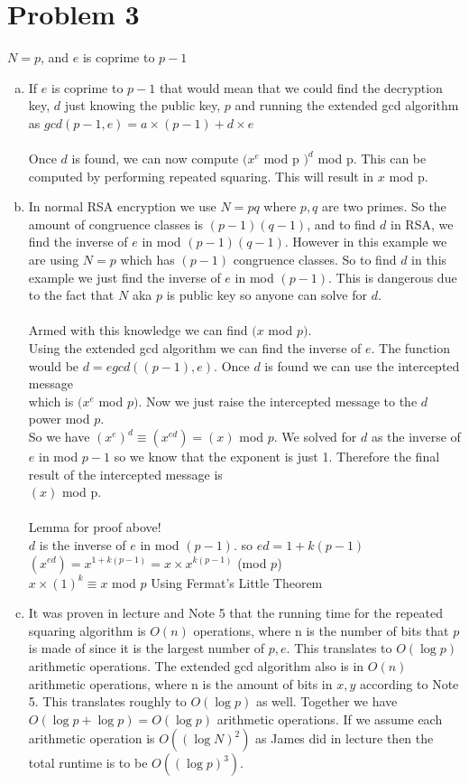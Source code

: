 \documentclass[11pt,letterpaper]{article}
\begin{document}
\section*{Problem 3}
$N=p$, and $e$ is coprime to $p-1$ 
\begin{enumerate}[(a)]
\item
If $e$ is coprime to $p-1$ that would mean that we could find the decryption key, $d$ just knowing the public key, $p$ and running the extended gcd algorithm as $gcd(p-1,e) = a\times(p-1)+d\times e$\\
\\
Once $d$ is found, we can now compute $(x^{e}$ mod p $)^{d}$ mod p. This can be computed by performing repeated squaring. This will result in $x$ mod p.\\

\item
In normal RSA encryption we use $N=pq$ where $p,q$ are two primes. So the amount of congruence classes is $(p-1)(q-1)$, and to find $d$ in RSA, we find the inverse of $e$ in mod $(p-1)(q-1)$. However in this example we are using $N=p$ which has $(p-1)$ congruence classes. So to find $d$ in this example we just find the inverse of $e$ in mod $(p-1)$. This is dangerous due to the fact that $N$ aka $p$ is public key so anyone can solve for $d$.\\
\\
Armed with this knowledge we can find $(x$ mod $p)$.\\
Using the extended gcd algorithm we can find the inverse of $e$. The function would be $d = egcd((p-1),e)$. Once $d$ is found we can use the intercepted message\\ which is $(x^e$ mod $p)$. Now we just raise the intercepted message to the $d$ power mod $p$.\\ So we have $(x^e)^d\equiv (x^{ed})= (x)$ mod $p$. We solved for $d$ as the inverse of $e$ in mod $p-1$ so we know that the exponent is just 1. Therefore the final result of the intercepted message is\\ $(x)$ mod p.
\\\\
Lemma for proof above!\\
$d$ is the inverse of $e$ in mod $(p-1)$. so $ed =1+k(p-1)$\\
$(x^{ed})= x^{1+k(p-1)} = x\times x^{k(p-1)}$ (mod $p$)\\
$x\times(1)^k \equiv x $ mod $p$ \hfill Using Fermat's Little Theorem
\item
It was proven in lecture and Note 5 that the running time for the repeated squaring algorithm is $O(n)$ operations, where n is the number of bits that $p$ is made of since it is the largest number of $p,e$. This translates to $O(\log{p})$ arithmetic operations. The extended gcd algorithm also is in $O(n)$ arithmetic operations, where n is the amount of bits in $x,y$ according to Note 5. This translates roughly to $O(\log{p})$ as well. Together we have $O(\log{p}+\log{p}) = O(\log{p})$ arithmetic operations. If we assume each arithmetic operation  is $O((\log{N})^2)$ as James did in lecture then the total runtime is to be $O((\log{p})^3)$.
\end{enumerate}
\clearpage
\end{document}
